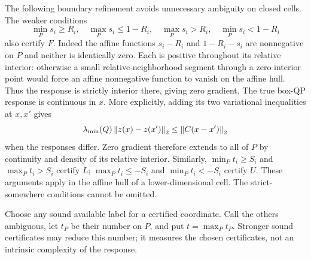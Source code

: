 The following boundary refinement avoids unnecessary ambiguity on closed
cells. The weaker conditions
\begin{equation}\label{eq:screening-closure-free}
 \min_Ps_i\ge R_i,\quad \max_Ps_i\le1-R_i,\quad
 \max_Ps_i>R_i,\quad \min_Ps_i<1-R_i
\end{equation}
also certify $F$. Indeed the affine functions $s_i-R_i$ and
$1-R_i-s_i$ are nonnegative on $P$ and neither is identically zero.
Each is positive throughout its relative interior: otherwise a small
relative-neighborhood segment through a zero interior point would force
an affine nonnegative function to vanish on the affine hull. Thus the
response is strictly interior there, giving zero gradient. The true
box-QP response is continuous in $x$. More explicitly, adding its two
variational inequalities at $x,x'$ gives
\[
 \lambda_{\min}(Q)\left\lVert z(x)-z(x')\right\rVert_2
                               \le\left\lVert C(x-x')\right\rVert_2
\]
when the responses differ. Zero gradient therefore extends to all of
$P$ by continuity and density of its relative interior.
Similarly, $\min_Pt_i\ge S_i$ and $\max_Pt_i>S_i$ certify $L$;
$\max_Pt_i\le-S_i$ and $\min_Pt_i<-S_i$ certify $U$.
These arguments apply in the affine hull of a lower-dimensional cell.
The strict-somewhere conditions cannot be omitted.

Choose any sound available label for a certified coordinate. Call the
others ambiguous, let $t_P$ be their number on $P$, and put
$t=\max_Pt_P$. Stronger sound certificates may reduce this number; it
measures the chosen certificates, not an intrinsic complexity of the
response.

